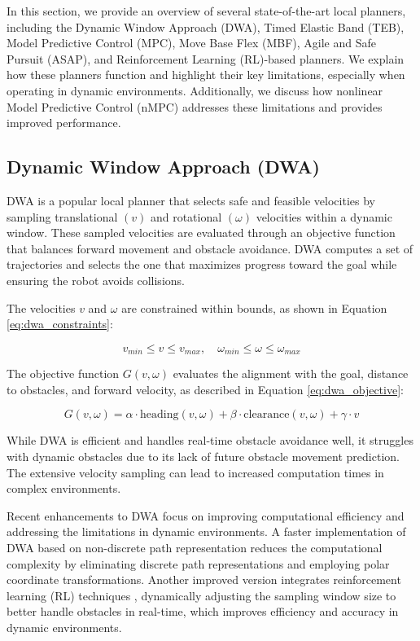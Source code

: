 \documentclass[conference]{IEEEtran}
\begin{document}
In this section, we provide an overview of several state-of-the-art local planners, including the Dynamic Window Approach (DWA), Timed Elastic Band (TEB), Model Predictive Control (MPC), Move Base Flex (MBF), Agile and Safe Pursuit (ASAP), and Reinforcement Learning (RL)-based planners. We explain how these planners function and highlight their key limitations, especially when operating in dynamic environments. Additionally, we discuss how nonlinear Model Predictive Control (nMPC) addresses these limitations and provides improved performance.

\subsection{Dynamic Window Approach (DWA)}
DWA is a popular local planner that selects safe and feasible velocities by sampling translational \((v)\) and rotational \((\omega)\) velocities within a dynamic window. These sampled velocities are evaluated through an objective function that balances forward movement and obstacle avoidance. DWA computes a set of trajectories and selects the one that maximizes progress toward the goal while ensuring the robot avoids collisions.

The velocities \(v\) and \(\omega\) are constrained within bounds, as shown in Equation \eqref{eq:dwa_constraints}:

\begin{equation}
\label{eq:dwa_constraints}
v_{min} \leq v \leq v_{max}, \quad \omega_{min} \leq \omega \leq \omega_{max}
\end{equation}

The objective function \(G(v, \omega)\) evaluates the alignment with the goal, distance to obstacles, and forward velocity, as described in Equation \eqref{eq:dwa_objective}:

\begin{equation}
\label{eq:dwa_objective}
G(v, \omega) = \alpha \cdot \text{heading}(v, \omega) + \beta \cdot \text{clearance}(v, \omega) + \gamma \cdot v
\end{equation}

While DWA is efficient and handles real-time obstacle avoidance well, it struggles with dynamic obstacles due to its lack of future obstacle movement prediction. The extensive velocity sampling can lead to increased computation times in complex environments.

Recent enhancements to DWA focus on improving computational efficiency and addressing the limitations in dynamic environments. A faster implementation of DWA based on non-discrete path representation \cite{lin2023faster} reduces the computational complexity by eliminating discrete path representations and employing polar coordinate transformations. Another improved version integrates reinforcement learning (RL) techniques \cite{zhou2022improved}, dynamically adjusting the sampling window size to better handle obstacles in real-time, which improves efficiency and accuracy in dynamic environments.
\end{document}
